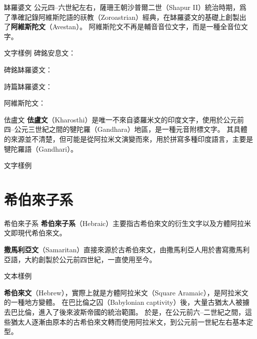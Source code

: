 \documentclass[aspectratio=169]{beamer}
\begin{document}
\begin{frame}{缽羅婆文}
    公元四--六世紀左右，薩珊王朝沙普爾二世（Shapur II）統治時期，爲了準確記錄阿維斯陀語的祆教（Zoroastrian）經典，在缽羅婆文的基礎上創製出了\textbf{阿維斯陀文}（Avestan）。
    阿維斯陀文不再是輔音音位文字，而是一種全音位文字。

    \begin{block}{文字樣例}
        碑銘安息文：\hfill{}
        
        碑銘缽羅婆文：\hfill{}

        詩篇缽羅婆文：\hfill{}

        阿維斯陀文：\hfill{}
    \end{block}
\end{frame}

\begin{frame}{佉盧文}
    \textbf{佉盧文}（Kharosthi）是唯一不來自婆羅米文的印度文字，使用於公元前四--公元三世紀之間的犍陀羅（Gandhara）地區，是一種元音附標文字。
    其具體的來源並不清楚，但可能是從阿拉米文演變而來，用於拼寫多種印度語言，主要是犍陀羅語（Gandhari）。

    \begin{block}{文字樣例}
        \raggedleft
    \end{block}
\end{frame}

\section{希伯來子系}
\begin{frame}{希伯來子系}
    \textbf{希伯來子系}（Hebraic）主要指古希伯來文的衍生文字以及方體阿拉米文即現代希伯來文。

    \textbf{撒馬利亞文}（Samaritan）直接來源於古希伯來文，由撒馬利亞人用於書寫撒馬利亞語，大約創製於公元前四世紀，一直使用至今。

    \begin{block}{文本樣例}
        \raggedleft
    \end{block}

    \textbf{希伯來文}（Hebrew），實際上就是方體阿拉米文（Square Aramaic），是阿拉米文的一種地方變體。
    在巴比倫之囚（Babylonian captivity）後，大量古猶太人被擄去巴比倫，進入了後來波斯帝國的統治範圍。
    於是，在公元前六--二世紀之間，這些猶太人逐漸由原本的古希伯來文轉而使用阿拉米文，到公元前一世紀左右基本定型。
\end{frame}
\end{document}
